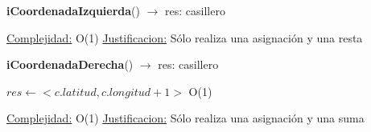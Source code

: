 \begin{Algoritmos}
\begin{algorithm}[H]{\textbf{iCoordenadaIzquierda}() $\to$ res: casillero}
\begin{algorithmic}[1]
		\medskip
		\Statex \underline{Complejidad:} O(1)
			\Statex \underline{Justificacion:} Sólo realiza una asignación y una resta
	\end{algorithmic}
\end{algorithm}


\begin{algorithm}[H]{\textbf{iCoordenadaDerecha}() $\to$ res: casillero}
	\begin{algorithmic}[1]
		\State $res \gets <c.latitud, c.longitud + 1>$ \Comment O(1)
		
		\medskip
		\Statex \underline{Complejidad:} O(1)
			\Statex \underline{Justificacion:} Sólo realiza una asignación y una suma
	\end{algorithmic}
\end{algorithm}

\end{Algoritmos}